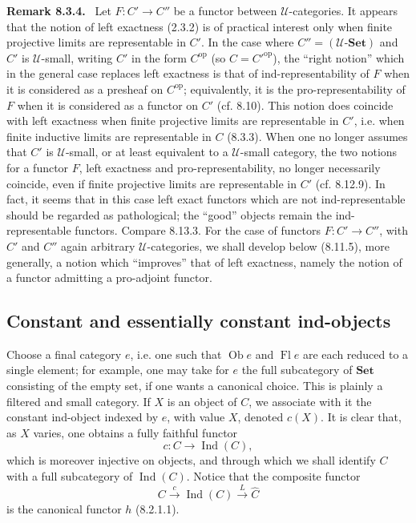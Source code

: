 \documentclass[11pt]{article}
\newcommand{\U}{\mathcal{U}}
\newcommand{\Set}{\mathbf{Set}}
\newcommand{\Ob}{\operatorname{Ob}}
\newcommand{\Fl}{\operatorname{Fl}}
\newcommand{\Ind}{\operatorname{Ind}}
\newcommand{\op}{\mathrm{op}}
\newenvironment{statement}[1]{\par\medskip\noindent\textbf{#1.}\ }{\par\medskip}
\begin{document}
\begin{statement}{Remark 8.3.4}
Let $F:C'\to C''$ be a functor between $\U$-categories. It appears that the notion of left exactness (2.3.2) is of practical interest only when finite projective limits are representable in $C'$. In the case where $C''=(\U\text{-}\Set)$ and $C'$ is $\U$-small, writing $C'$ in the form $C^{\op}$ (so $C={C'}^{\op}$), the ``right notion'' which in the general case replaces left exactness is that of ind-representability of $F$ when it is considered as a presheaf on $C^{\op}$; equivalently, it is the pro-representability of $F$ when it is considered as a functor on $C'$ (cf. 8.10). This notion does coincide with left exactness when finite projective limits are representable in $C'$, i.e. when finite inductive limits are representable in $C$ (8.3.3). When one no longer assumes that $C'$ is $\U$-small, or at least equivalent to a $\U$-small category, the two notions for a functor $F$, left exactness and pro-representability, no longer necessarily coincide, even if finite projective limits are representable in $C'$ (cf. 8.12.9). In fact, it seems that in this case left exact functors which are not ind-representable should be regarded as pathological; the ``good'' objects remain the ind-representable functors. Compare 8.13.3. For the case of functors $F:C'\to C''$, with $C'$ and $C''$ again arbitrary $\U$-categories, we shall develop below (8.11.5), more generally, a notion which ``improves'' that of left exactness, namely the notion of a functor admitting a pro-adjoint functor.
\end{statement}

\subsection{Constant and essentially constant ind-objects}

Choose a final category $e$, i.e. one such that $\Ob e$ and $\Fl e$ are each reduced to a single element; for example, one may take for $e$ the full subcategory of $\Set$ consisting of the empty set, if one wants a canonical choice. This is plainly a filtered and small category. If $X$ is an object of $C$, we associate with it the constant ind-object indexed by $e$, with value $X$, denoted $c(X)$. It is clear that, as $X$ varies, one obtains a fully faithful functor
\[
c:C\longrightarrow\Ind(C),
\tag{8.4.1}
\]
which is moreover injective on objects, and through which we shall identify $C$ with a full subcategory of $\Ind(C)$. Notice that the composite functor
\[
C\xrightarrow{c}\Ind(C)\xrightarrow{L}\widehat C
\tag{8.4.2}
\]
is the canonical functor $h$ (8.2.1.1).
\end{document}
